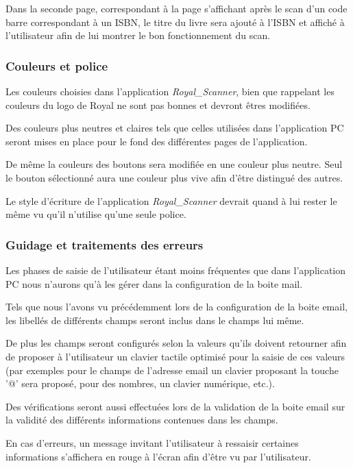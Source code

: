\documentclass[etudiants]{support-iutrs}
\begin{document}
Dans la seconde page, correspondant à la page s'affichant après le scan d'un code barre correspondant à un ISBN, le titre du livre sera ajouté à l'ISBN et affiché à l'utilisateur afin de lui montrer le bon fonctionnement du scan. 

\subsubsection{Couleurs et police}
Les couleurs choisies dans l'application \emph{Royal\_Scanner}, bien que rappelant les couleurs du logo de Royal ne sont pas bonnes et devront êtres modifiées.

Des couleurs plus neutres et claires tels que celles utilisées dans l'application PC seront mises en place pour le fond des différentes pages de l’application.

De même la couleurs des boutons sera modifiée en une couleur plus neutre.
Seul le bouton sélectionné aura une couleur plus vive afin d'être distingué des autres. 

Le style d'écriture de l'application \emph{Royal\_Scanner} devrait quand à lui rester le même vu qu'il n'utilise qu'une seule police. 

\subsubsection{Guidage et traitements des erreurs}
Les phases de saisie de l'utilisateur étant moins fréquentes que dans l'application PC nous n'aurons qu'à les gérer dans la configuration de la boite mail.  

Tels que nous l'avons vu précédemment lors de la configuration de la boite email, les libellés de différents champs seront inclus dans le champs lui même.
 
De plus les champs seront configurés selon la valeurs qu'ils doivent retourner afin de proposer à l'utilisateur un clavier tactile optimisé pour la saisie de ces valeurs (par exemples pour le champs de l'adresse email un clavier proposant la touche '@' sera proposé, pour des nombres, un clavier numérique, etc.).

Des vérifications seront aussi effectuées lors de la validation de la boite email sur la validité des différents informations contenues dans les champs.

En cas d'erreurs, un message invitant l'utilisateur à ressaisir certaines informations s'affichera en rouge à l'écran afin d'être vu par l'utilisateur. 
\end{document}
